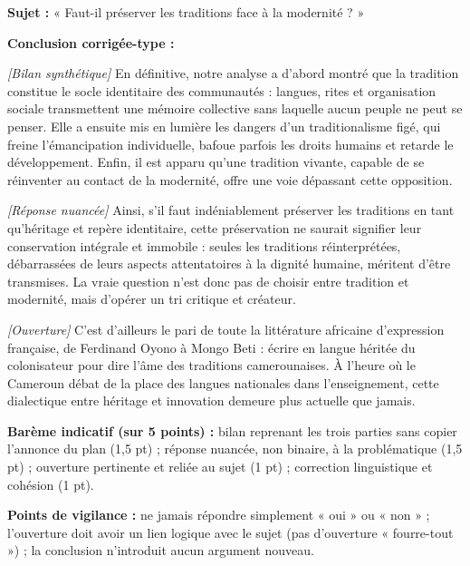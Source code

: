\documentclass[11pt]{article}
\begin{document}
\begin{corrige}
\textbf{Sujet :} « Faut-il préserver les traditions face à la modernité ? »

\textbf{Conclusion corrigée-type :}

\emph{[Bilan synthétique]} En définitive, notre analyse a d'abord montré que la tradition constitue le socle identitaire des communautés : langues, rites et organisation sociale transmettent une mémoire collective sans laquelle aucun peuple ne peut se penser. Elle a ensuite mis en lumière les dangers d'un traditionalisme figé, qui freine l'émancipation individuelle, bafoue parfois les droits humains et retarde le développement. Enfin, il est apparu qu'une tradition vivante, capable de se réinventer au contact de la modernité, offre une voie dépassant cette opposition.

\emph{[Réponse nuancée]} Ainsi, s'il faut indéniablement préserver les traditions en tant qu'héritage et repère identitaire, cette préservation ne saurait signifier leur conservation intégrale et immobile : seules les traditions réinterprétées, débarrassées de leurs aspects attentatoires à la dignité humaine, méritent d'être transmises. La vraie question n'est donc pas de choisir entre tradition et modernité, mais d'opérer un tri critique et créateur.

\emph{[Ouverture]} C'est d'ailleurs le pari de toute la littérature africaine d'expression française, de Ferdinand Oyono à Mongo Beti : écrire en langue héritée du colonisateur pour dire l'âme des traditions camerounaises. À l'heure où le Cameroun débat de la place des langues nationales dans l'enseignement, cette dialectique entre héritage et innovation demeure plus actuelle que jamais.

\textbf{Barème indicatif (sur 5 points) :} bilan reprenant les trois parties sans copier l'annonce du plan (1,5 pt) ; réponse nuancée, non binaire, à la problématique (1,5 pt) ; ouverture pertinente et reliée au sujet (1 pt) ; correction linguistique et cohésion (1 pt).

\textbf{Points de vigilance :} ne jamais répondre simplement « oui » ou « non » ; l'ouverture doit avoir un lien logique avec le sujet (pas d'ouverture « fourre-tout ») ; la conclusion n'introduit aucun argument nouveau.
\end{corrige}
\end{document}
